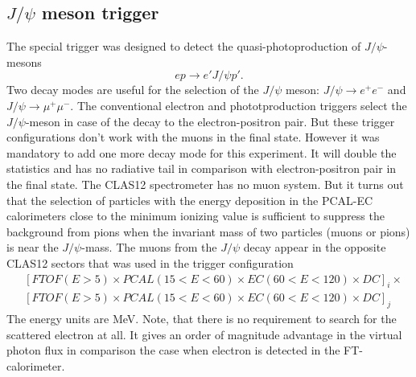 \subsection{$J/\psi$ meson trigger}

The special trigger was designed to detect the quasi-photoproduction of $J/\psi$-mesons
$$
ep \to e' J/\psi p'.
$$
Two decay modes are useful for the selection of the $J/\psi$ meson: $J/\psi \to e^+e^-$ and $J/\psi \to \mu^+\mu^-$.
The conventional electron and phototproduction triggers  select the $J/\psi$-meson  in case of the decay to the electron-positron pair.
But these trigger configurations don't  work  with the muons in the final state. However it was mandatory to add one more decay mode for this experiment. It will double the statistics and has no radiative tail in comparison with electron-positron pair in the final state. The CLAS12 spectrometer has no muon system. But it turns out that the selection of particles with the energy deposition in the
PCAL-EC  calorimeters close to the minimum  ionizing  value is sufficient to suppress the background from pions when the 
invariant mass of two  particles (muons or pions) is near the $J/\psi$-mass. The muons from the $J/\psi$ decay appear in the opposite CLAS12 sectors that was used in the trigger configuration  
\begin{align*} 
 & [FTOF(E{{>}}5){\times}  PCAL(15{<}E{<}60){\times} EC(60{<}E{<}120){\times}   DC]_i {\times} \\
 & [FTOF(E{{>}}5){\times}  PCAL(15{<}E{<}60){\times} EC(60{<}E{<}120){\times}   DC]_j  
\end{align*}
\noindent
The energy units are MeV. Note, that there is no requirement to search for the scattered electron at all. It gives an order of magnitude advantage in the  virtual photon flux in comparison the case when electron is detected in the FT-calorimeter.




